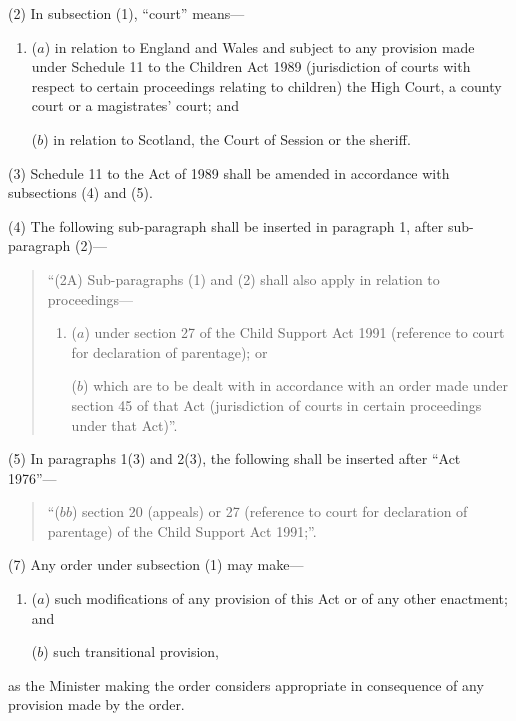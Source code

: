 \documentclass[12pt,a4paper]{article}
\begin{document}
(2) In subsection (1), “court” means—
\begin{enumerate}\item[]
($a$) in relation to England and Wales and subject to any provision made under Schedule 11 to the Children Act 1989 (jurisdiction of courts with respect to certain proceedings relating to children) the High Court, a county court or a magistrates' court; and

($b$) in relation to Scotland, the Court of Session or the sheriff.
\end{enumerate}

(3) Schedule 11 to the Act of 1989 shall be amended in accordance with subsections (4)  and (5).

(4) The following sub-paragraph shall be inserted in paragraph 1, after sub-paragraph (2)—
\begin{quotation}
“(2A) Sub-paragraphs (1)  and (2)  shall also apply in relation to proceedings—
\begin{enumerate}\item[]
($a$) under section 27 of the Child Support Act 1991 (reference to court for declaration of parentage); or

($b$) which are to be dealt with in accordance with an order made under section 45 of that Act (jurisdiction of courts in certain proceedings under that Act)”.
\end{enumerate}
\end{quotation}

(5) In paragraphs 1(3)  and 2(3), the following shall be inserted after “Act 1976”—
\begin{quotation}
“($bb$) section 20 (appeals) or 27 (reference to court for declaration of parentage) of the Child Support Act 1991;”.
\end{quotation}


(7) Any order under subsection (1)  
may make—
\begin{enumerate}\item[]
($a$) such modifications of any provision of this Act or of any other enactment; and

($b$) such transitional provision,
\end{enumerate}
as the Minister making the order considers appropriate in consequence of any provision made by the order.
\end{document}

